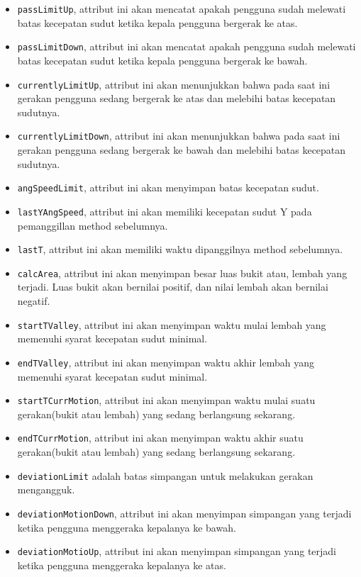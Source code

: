 \begin{itemize}
	\item \texttt{passLimitUp}, attribut ini akan mencatat apakah pengguna sudah melewati batas kecepatan sudut ketika kepala pengguna bergerak ke atas.
	\item \texttt{passLimitDown}, attribut ini akan mencatat apakah pengguna sudah melewati batas kecepatan sudut ketika kepala pengguna bergerak ke bawah.
	\item \texttt{currentlyLimitUp}, attribut ini akan menunjukkan bahwa pada saat ini gerakan pengguna sedang bergerak ke atas dan melebihi batas kecepatan sudutnya.
	\item \texttt{currentlyLimitDown}, attribut ini akan menunjukkan bahwa pada saat ini gerakan pengguna sedang bergerak ke bawah dan melebihi batas kecepatan sudutnya.
	\item \texttt{angSpeedLimit}, attribut ini akan menyimpan batas kecepatan sudut.
	\item \texttt{lastYAngSpeed}, attribut ini akan memiliki kecepatan sudut Y pada pemanggillan method sebelumnya. 
	\item \texttt{lastT}, attribut ini akan memiliki waktu dipanggilnya method sebelumnya. 
	\item \texttt{calcArea}, attribut ini akan menyimpan besar luas bukit atau, lembah yang terjadi. Luas bukit akan bernilai positif, dan nilai lembah akan bernilai negatif. 
	\item \texttt{startTValley}, attribut ini akan menyimpan waktu mulai lembah yang memenuhi syarat kecepatan sudut minimal. 
	\item \texttt{endTValley}, attribut ini akan menyimpan waktu akhir lembah yang memenuhi syarat kecepatan sudut minimal.
	\item \texttt{startTCurrMotion}, attribut ini akan menyimpan waktu mulai suatu gerakan(bukit atau lembah) yang sedang berlangsung sekarang.
	\item \texttt{endTCurrMotion}, attribut ini akan menyimpan waktu akhir suatu gerakan(bukit atau lembah) yang sedang berlangsung sekarang.
	\item \texttt{deviationLimit} adalah batas simpangan untuk melakukan gerakan mengangguk.
	\item \texttt{deviationMotionDown}, attribut ini akan menyimpan simpangan yang terjadi ketika pengguna menggeraka kepalanya ke bawah. 
	\item \texttt{deviationMotioUp}, attribut ini akan menyimpan simpangan yang terjadi ketika pengguna menggeraka kepalanya ke atas. 
\end{itemize}

